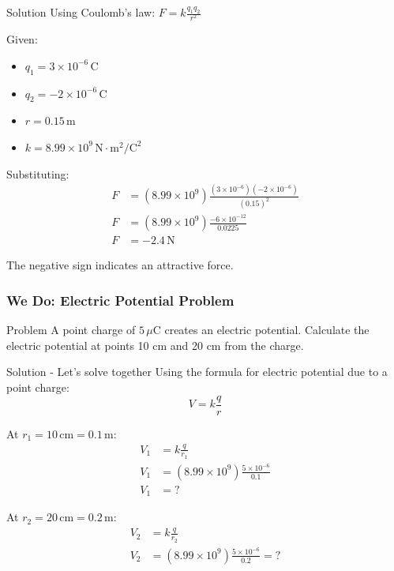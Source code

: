 \documentclass{beamer}
\begin{document}
\begin{frame}
    \begin{block}{Solution}
        Using Coulomb's law: $F = k\frac{q_1 q_2}{r^2}$
        
        Given:
        \begin{itemize}
            \item $q_1 = 3 \times 10^{-6} \,\text{C}$
            \item $q_2 = -2 \times 10^{-6} \,\text{C}$
            \item $r = 0.15 \,\text{m}$
            \item $k = 8.99 \times 10^9 \,\text{N}\cdot\text{m}^2/\text{C}^2$
        \end{itemize}
        
        Substituting:
        \begin{align}
            F &= (8.99 \times 10^9) \frac{(3 \times 10^{-6})(-2 \times 10^{-6})}{(0.15)^2} \\
            F &= (8.99 \times 10^9) \frac{-6 \times 10^{-12}}{0.0225} \\
            F &= -2.4 \,\text{N}
        \end{align}
        
        The negative sign indicates an attractive force.
    \end{block}
\end{frame}

\begin{frame}
    \frametitle{We Do: Electric Potential Problem}
    \begin{block}{Problem}
        A point charge of $5 \,\mu\text{C}$ creates an electric potential. Calculate the electric potential at points 10 cm and 20 cm from the charge.
    \end{block}
    \end{frame}

\begin{frame}
    \begin{block}{Solution - Let's solve together}
        Using the formula for electric potential due to a point charge:
        \begin{equation}
            V = k\frac{q}{r}
        \end{equation}
        
        At $r_1 = 10 \,\text{cm} = 0.1 \,\text{m}$:
        \begin{align}
            V_1 &= k\frac{q}{r_1} \\
            V_1 &= (8.99 \times 10^9) \frac{5 \times 10^{-6}}{0.1} \\
            V_1 &= ?
        \end{align}
        
        At $r_2 = 20 \,\text{cm} = 0.2 \,\text{m}$:
        \begin{align}
            V_2 &= k\frac{q}{r_2} \\
            V_2 &= (8.99 \times 10^9) \frac{5 \times 10^{-6}}{0.2} = ?
        \end{align}
    \end{block}
\end{frame}
\end{document}
